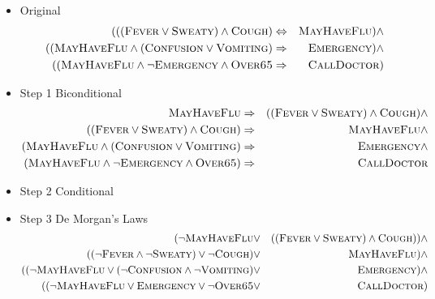 \documentclass[11pt]{article}
\begin{document}
\begin{itemize}
\item Original
\begin{eqnarray*}
 (((\mathrm{\textsc{Fever}} \lor \mathrm{\textsc{Sweaty}}) \land \mathrm{\textsc{Cough}}) &\Leftrightarrow& \mathrm{\textsc{MayHaveFlu}}) \land \\
 ((\mathrm{\textsc{MayHaveFlu}} \land (\mathrm{\textsc{Confusion}} \lor \mathrm{\textsc{Vomiting}}) &\Rightarrow& \mathrm{\textsc{Emergency}}) \land\\
 ((\mathrm{\textsc{MayHaveFlu}} \land \lnot \mathrm{\textsc{Emergency}} \land \mathrm{\textsc{Over65}} &\Rightarrow& \mathrm{\textsc{CallDoctor}}) \\
\end{eqnarray*}

\item Step 1
Biconditional
\begin{eqnarray*}
 \mathrm{\textsc{MayHaveFlu}}  &\Rightarrow& ((\mathrm{\textsc{Fever}} \lor \mathrm{\textsc{Sweaty}}) \land \mathrm{\textsc{Cough}})  \land \\
 ((\mathrm{\textsc{Fever}} \lor \mathrm{\textsc{Sweaty}}) \land \mathrm{\textsc{Cough}}) &\Rightarrow& \mathrm{\textsc{MayHaveFlu}} \land \\
 (\mathrm{\textsc{MayHaveFlu}} \land (\mathrm{\textsc{Confusion}} \lor \mathrm{\textsc{Vomiting}}) &\Rightarrow& \mathrm{\textsc{Emergency}}\land \\
 (\mathrm{\textsc{MayHaveFlu}} \land \lnot \mathrm{\textsc{Emergency}} \land \mathrm{\textsc{Over65}}) &\Rightarrow& \mathrm{\textsc{CallDoctor}} \\
\end{eqnarray*}

\item Step 2
Conditional

\vspace{2cm}


\item Step 3
De Morgan's Laws
\begin{eqnarray*}
 (\lnot \mathrm{\textsc{MayHaveFlu}}  &\lor& ((\mathrm{\textsc{Fever}} \lor \mathrm{\textsc{Sweaty}}) \land \mathrm{\textsc{Cough}}))  \land \\
 ( (\lnot \mathrm{\textsc{Fever}} \land  \lnot \mathrm{\textsc{Sweaty}}) \lor \lnot \mathrm{\textsc{Cough}}) &\lor& \mathrm{\textsc{MayHaveFlu}}) \land \\
 ( ( \lnot \mathrm{\textsc{MayHaveFlu}} \lor (\lnot \mathrm{\textsc{Confusion}} \land \lnot \mathrm{\textsc{Vomiting}}) &\lor& \mathrm{\textsc{Emergency}})\land \\
 ((\lnot \mathrm{\textsc{MayHaveFlu}} \lor  \mathrm{\textsc{Emergency}} \lor \lnot \mathrm{\textsc{Over65}} &\lor& \mathrm{\textsc{CallDoctor}})\\
\end{eqnarray*}


\end{itemize}
\end{document}
